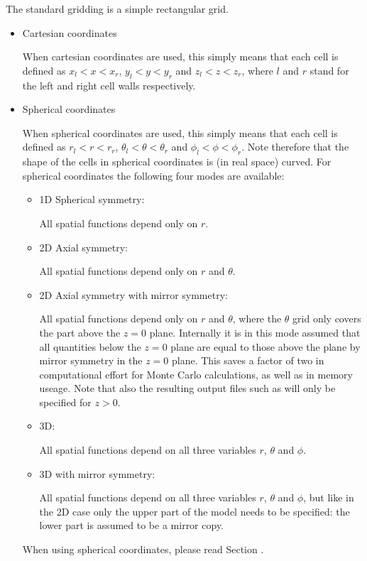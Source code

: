 \documentclass[letterpaper,10pt,english]{sphinxmanual}
\begin{document}
The standard gridding is a simple rectangular grid.
\begin{itemize}
\item {} 
Cartesian coordinates

When cartesian coordinates are used, this simply means that each cell is
defined as \(x_l<x<x_r\), \(y_l<y<y_r\) and \(z_l<z<z_r\), where
\(l\) and \(r\) stand for the left and right cell walls respectively.

\item {} 
Spherical coordinates

When spherical coordinates are used, this simply means that each cell is
defined as \(r_l<r<r_r\), \(\theta_l<\theta<\theta_r\) and
\(\phi_l<\phi<\phi_r\).  Note therefore that the shape of the cells in
spherical coordinates is (in real space) curved. For spherical coordinates the
following four modes are available:
\begin{itemize}
\item {} 
1\sphinxhyphen{}D Spherical symmetry:

All spatial functions depend only on \(r\).

\item {} 
2\sphinxhyphen{}D Axial symmetry:

All spatial functions depend only on \(r\) and \(\theta\).

\item {} 
2\sphinxhyphen{}D Axial symmetry with mirror symmetry:

All spatial functions depend only on \(r\) and \(\theta\), where the
\(\theta\) grid only covers the part above the \(z=0\)
plane. Internally it is in this mode assumed that all quantities below the
\(z=0\) plane are equal to those above the plane by mirror symmetry in
the \(z=0\) plane.  This saves a factor of two in computational effort
for Monte Carlo calculations, as well as in memory useage. Note that also
the resulting output files such as  will only be
specified for \(z>0\).

\item {} 
3\sphinxhyphen{}D:

All spatial functions depend on all three variables
\(r\), \(\theta\) and \(\phi\).

\item {} 
3\sphinxhyphen{}D with mirror symmetry:

All spatial functions depend on all three variables \(r\),
\(\theta\) and \(\phi\), but like in the 2\sphinxhyphen{}D case only the upper
part of the model needs to be specified: the lower part is assumed to be a
mirror copy.

\end{itemize}

When using spherical coordinates, please read Section
{\hyperref[\detokenize{gridding:sec-separable-refinement}]{}}.

\end{itemize}
\end{document}
